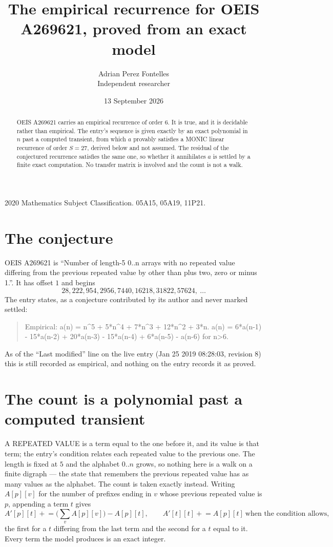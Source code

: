 \documentclass[11pt,a4paper]{article}
\title{The empirical recurrence for OEIS A269621, proved from an exact model}
\author{Adrian Perez Fontelles\\ \small Independent researcher}
\date{13 September 2026}
\theoremstyle{plain}
\theoremstyle{definition}
\begin{document}
\maketitle

\begin{abstract}
OEIS A269621 carries an empirical recurrence of order $6$. It is true, and it is
decidable rather than empirical. The entry's sequence is given exactly by an exact polynomial in $n$ past a computed transient, from
which $a$ provably satisfies a MONIC linear recurrence of order $S=27$, derived below and not
assumed. The residual of the conjectured recurrence satisfies the same one, so whether it
annihilates $a$ is settled by a finite exact computation. No transfer matrix is involved and
the count is not a walk.
\end{abstract}

\noindent\small 2020 Mathematics Subject Classification. 05A15, 05A19, 11P21.\normalsize

\section{The conjecture}

OEIS A269621 is ``Number of length-5 0..n arrays with no repeated value differing from the previous repeated value by other than plus two, zero or minus 1.''. It has offset $1$ and begins
\[
28, 222, 954, 2956, 7440, 16218, 31822, 57624,\ \dots
\]
The entry states, as a conjecture contributed by its author and never marked settled:
\begin{quote}
Empirical: a(n) = n\^{}5 + 5*n\^{}4 + 7*n\^{}3 + 12*n\^{}2 + 3*n. a(n) = 6*a(n-1) - 15*a(n-2) + 20*a(n-3) - 15*a(n-4) + 6*a(n-5) - a(n-6) for n>6.
\end{quote}
As of the ``Last modified'' line on the live entry (Jan 25 2019 08:28:03, revision 8)
this is still recorded as empirical, and nothing on the entry records it as proved.

\section{The count is a polynomial past a computed transient}

A REPEATED VALUE is a term equal to the one before it, and its value is that term; the entry's
condition relates each repeated value to the previous one. The length is fixed at $5$ and the
alphabet $0..n$ grows, so nothing here is a walk on a finite digraph --- the state that
remembers the previous repeated value has as many values as the alphabet. The count is taken
exactly instead. Writing $A[p][v]$ for the number of prefixes ending in $v$ whose previous
repeated value is $p$, appending a term $t$ gives
\[
A'[p][t] \mathrel{+}= \Big(\sum_v A[p][v]\Big) - A[p][t],
\qquad
A'[t][t] \mathrel{+}= A[p][t]\ \text{when the condition allows},
\]
the first for a $t$ differing from the last term and the second for a $t$ equal to it. Every
term the model produces is an exact integer.
\end{document}
